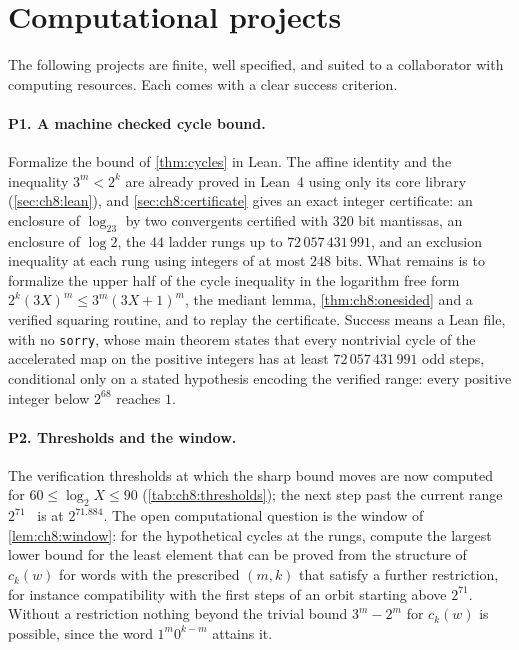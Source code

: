 \section{Computational projects}\label{sec:ch11:projects}

The following projects are finite, well specified, and suited to a
collaborator with computing resources. Each comes with a clear success
criterion.

\paragraph{P1. A machine checked cycle bound.} Formalize the bound of
\cref{thm:cycles} in Lean. The affine identity and the inequality $3^m<2^k$ are
already proved in Lean~4 using only its core library (\cref{sec:ch8:lean}), and
\cref{sec:ch8:certificate} gives an exact integer certificate: an enclosure of
$\log_23$ by two convergents certified with $320$ bit mantissas, an enclosure
of $\log2$, the $44$ ladder rungs up to $72\,057\,431\,991$, and an exclusion
inequality at each rung using integers of at most $248$ bits. What remains is
to formalize the upper half of the cycle inequality in the logarithm free form
$2^k(3X)^m\le3^m(3X+1)^m$, the mediant lemma, \cref{thm:ch8:onesided} and a verified squaring routine,
and to replay the certificate. Success means a Lean file, with no
\texttt{sorry}, whose main theorem states that every nontrivial cycle of the accelerated map on the positive integers has at least $72\,057\,431\,991$ odd steps, conditional only on a stated hypothesis encoding the verified range: every positive integer below $2^{68}$ reaches $1$.

\paragraph{P2. Thresholds and the window.} The verification thresholds at which
the sharp bound moves are now computed for $60\le\log_2X\le90$
(\cref{tab:ch8:thresholds}); the next step past the current range $2^{71}$~\cite{barina2025} is at $2^{71.884}$. The
open computational question is the window of \cref{lem:ch8:window}: for the
hypothetical cycles at the rungs, compute the largest lower bound for the least
element that can be proved from the structure of $c_k(w)$ for words with the
prescribed $(m,k)$ that satisfy a further restriction, for instance compatibility with the first steps of an orbit starting above $2^{71}$.
Without a restriction nothing beyond the trivial bound $3^m-2^m$ for $c_k(w)$ is possible, since the word $1^m0^{k-m}$ attains it.

